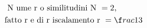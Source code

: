 \documentclass[preview]{standalone}
\begin{document}
\begin{align*}
&\text{ N ume r o similitudini  N  } = 2 \text{,} \\& \text{fatto r e di  r iscalamento  r } = \f r ac{1}{3}
\end{align*}
\end{document}
